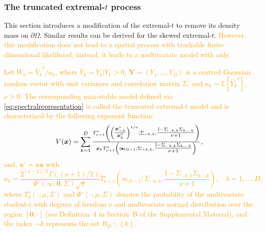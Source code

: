 \documentclass[12pt]{article}
\newcommand{\PZ}{\textcolor{orange}}
\begin{document}
\subsubsection{The truncated extremal-$t$ process}

This section introduces a modification of the  extremal-$t$ to remove its density mass on $\partial\Omega$. Similar results can be derived for the skewed extremal-$t$. 
\PZ{However, this modification does not lead to a spatial process with trackable finite-dimensional likelihood, instead, it leads to a multivariate model with only.}      
\begin{theorem}
\label{thm:truncated_extremal_t}   
\PZ{Let $W_k = \tilde{Y_k}^\nu / a_k$, where $\tilde{Y_k} = Y_k|Y_k >0$, $\bm Y = (Y_1,\dots,Y_D)$ is a centred Gaussian random vector with unit variances and correlation matrix $\Sigma$, and $a_k = \mathbb{E}\left[ \tilde{Y_k}^\nu\right]$, $\nu>0$.
The corresponding max-stable model defined via \eqref{eq:spectralrepresentation} is called the truncated extremal-$t$ model and is characterized by the following exponent function:
%
\begin{equation}
\label{eq:V_tet}
V({\boldsymbol{x}}) = \sum_{k=1}^D {\textstyle{T_{\nu+1}^\circ\left( \left({\textstyle{\bm x_{-k}^\circ\over\bm x_{k}^\circ}}\right)^{1/\nu} ;\Sigma_{-k,k},{\textstyle{\mathbb{I}-\Sigma_{-k,k}\Sigma_{k,-k} \over\nu+1}}\right)\over\bm x_k T_{\nu+1}^\circ\left(\bm \infty_{D-1};\Sigma_{-k,k}, {\textstyle{\mathbb{I}-\Sigma_{-k,k} \Sigma_{k,-k}\over\nu+1}}\right)}},
\end{equation}
%
and, $\bm x^\circ = \bm x \bm a$ with
\begin{equation*}
a_k = \frac{2^{(\nu-2)/2}\Gamma((\nu+1)/2)}{\Phi^\circ(\bm \infty;\bm 0, \Sigma) \sqrt{\pi}} T_{\nu+1}^\circ\left(
\bm \infty_{D-1};
\Sigma_{-k,k}, \frac{\mathbb{I} -\Sigma_{-k,k} \Sigma_{k,-k}}{\nu+1} \right), \quad k=1,\dots,D,	    
\end{equation*}
where $T_{\nu}^\circ(\cdot; \mu, \Sigma)$ and $\Phi^\circ(\cdot; \mu, \Sigma)$ denotes the probablity of the multivariate student-$t$ with degrees of freedom $\nu$ and multivariate normal distribution over the region $[\bm 0,\cdot]$ (see Definition~4 in Section~B of the Supplemental Material), and the index $-k$ represents the set $B_D \backslash \left\{ k\right\}$.}
%
\end{theorem}
\end{document}
